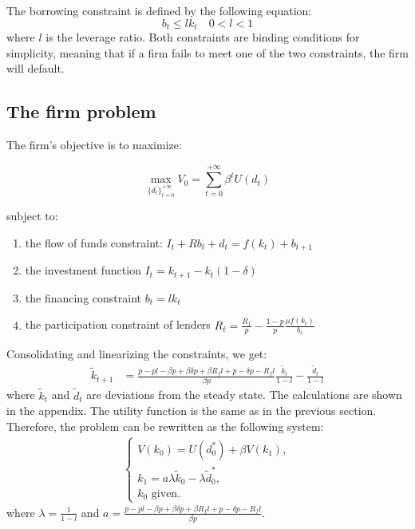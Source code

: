 \documentclass[12pt]{report}
\begin{document}
The borrowing constraint is defined by the following equation:
\begin{equation}
    b_t \leq l k_t \quad 0 < l < 1 \label{eq:borrowing}
\end{equation}
where \(l\) is the leverage ratio. Both constraints are binding conditions for simplicity, meaning that if a firm fails
to meet one of the two constraints, the firm will default. 
\subsection{The firm problem}
The firm's objective is to maximize:

\[
\max_{{\{d_{t}\}}_{t=0}^{+\infty}}V_0 = \sum_{t=0}^{+\infty}{\beta^t U(d_t)}
\]

subject to:
\begin{enumerate}
    \item the flow of funds constraint: \(I_t + R b_{t} + d_t = f(k_t) + b_{t+1}\)
    \item the investment function \(I_t = k_{t+1} - k_{t}\left(1-\delta\right)\) 
    \item the financing constraint \(b_t=l k_t\)
    \item the participation constraint of lenders \(R_t=\frac{R_f}{p}  -\frac{ 1-p }{ p }\frac{\mu f(k_t)}{b_t}\)
\end{enumerate}
Consolidating and linearizing the constraints, we get:
\begin{align}
    \tilde{k}_{t+1} &= \frac{p - p l - \beta p + \beta \delta p + \beta R_f l + p - \delta p - R_f l}{\beta p} \frac{ \tilde{k}_t}{1-l} - \frac{\tilde{d}_t}{1-l} \label{eq:linearized_flow}
\end{align}
where \(\tilde{k}_t\) and \(\tilde{d}_t\) are deviations from the steady state. The calculations are shown in the
appendix.
The utility function is the same as in the previous section. Therefore, the problem can be rewritten as the following system:
\begin{align*}
     \begin{cases}
         V(k_0) = U(d_0^*) + \beta V(k_1), \\
         k_1 =  a \lambda \tilde{k}_0 - \lambda \tilde{d}^*_0, \\
         k_0 \text{ given.}
     \end{cases}
 \end{align*}
where \(\lambda = \frac{1}{1-l}\) and \(a = \frac{p - p l - \beta p + \beta \delta p + \beta R_f l + p - \delta p - R_f l}{\beta p}\).
\end{document}

